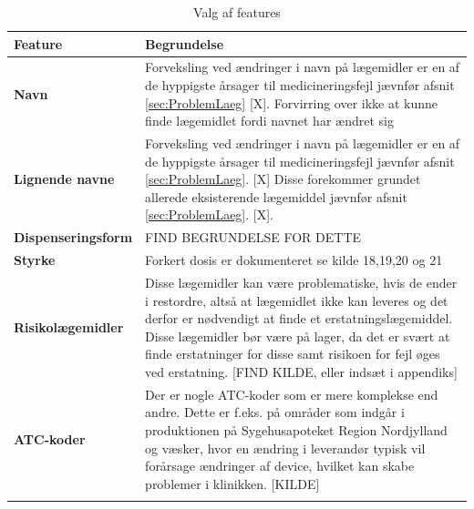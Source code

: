 \begin{table}[H]
\caption{Valg af features}
\label{table:features}
\vspace{0.5cm}
\begin{tabular}{p{3.5cm} | p{11cm}}
{\cellcolor[HTML]{C0C0C0}\textbf{Feature}} & {\cellcolor[HTML]{C0C0C0}\textbf{Begrundelse}} \vspace{2mm} \\ \hline \vspace{0.1mm}
\textbf{Navn} & \vspace{0.1mm} Forveksling ved ændringer i navn på lægemidler er en af de hyppigste årsager til medicineringsfejl jævnfør afsnit \ref{sec:ProblemLaeg} [X]. Forvirring over ikke at kunne finde lægemidlet fordi navnet har ændret sig \\  \hline \vspace{0.1mm}
\textbf{Lignende navne} & \vspace{0.1mm}  Forveksling ved ændringer i navn på lægemidler er en af de hyppigste årsager til medicineringsfejl jævnfør afsnit \ref{sec:ProblemLaeg}. [X] Disse forekommer grundet allerede eksisterende lægemiddel jævnfør afsnit \ref{sec:ProblemLaeg}. [X]. \\  \hline \vspace{0.1mm}
\textbf{Dispenseringsform} & \vspace{0.1mm} FIND BEGRUNDELSE FOR DETTE  \\ \hline \vspace{0.1mm}
\textbf{Styrke} & \vspace{0.1mm} Forkert dosis er dokumenteret se kilde 18,19,20 og 21  \\ \hline \vspace{0.1mm}
\textbf{Risikolægemidler} & \vspace{0.1mm} Disse lægemidler kan være problematiske, hvis de ender i restordre, altså at lægemidlet ikke kan leveres og det derfor er nødvendigt at finde et erstatningslægemiddel. Disse lægemidler bør være på lager, da det er svært at finde erstatninger for disse samt risikoen for fejl øges ved erstatning. [FIND KILDE, eller indsæt i appendiks]  \\ \hline \vspace{0.1mm}
\textbf{ATC-koder} & \vspace{0.1mm} Der er nogle ATC-koder som er mere komplekse end andre. Dette er f.eks. på områder som indgår i produktionen på Sygehusapoteket Region Nordjylland og væsker, hvor en ændring i leverandør typisk vil forårsage ændringer af device, hvilket kan skabe problemer i klinikken. [KILDE] \\ \hline \vspace{0.1mm}

\end{tabular}
\end{table}
